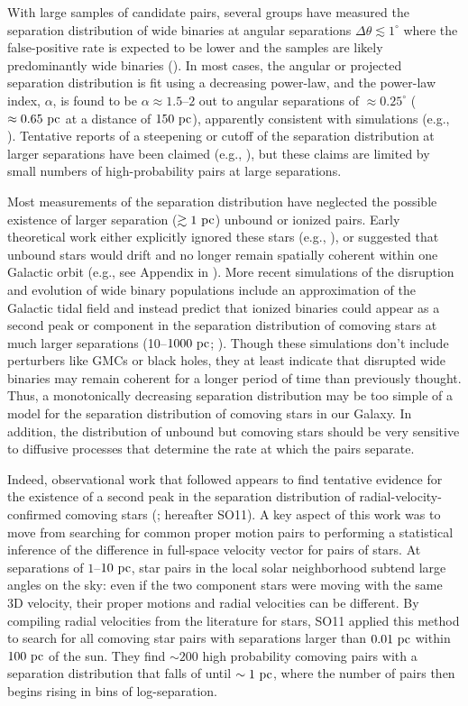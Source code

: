 \documentclass[modern, letterpaper]{aastex61}
\begin{document}
With large samples of candidate pairs, several groups have measured the
separation distribution of wide binaries at angular separations $\Delta \theta
\lesssim 1^\circ$ where the false-positive rate is expected to be lower
and the samples are likely predominantly wide binaries
(\citealt{Chaname:2004,Lepine:2007,Sesar:2008}).
In most cases, the angular or projected separation distribution is fit using a
decreasing power-law, and the power-law index, $\alpha$, is found to be $\alpha
\approx 1.5$--$2$ out to angular separations of $\approx 0.25^\circ$ ($\approx
0.65~\mathrm{pc}$ at a distance of $150~\mathrm{pc}$), apparently consistent with simulations
(e.g., \citealt{Weinberg:1987}).
Tentative reports of a steepening or cutoff of the separation distribution at
larger separations have been claimed (e.g., \citealt{Yoo:2004,Quinn:2009}), but
these claims are limited by small numbers of high-probability pairs at large
separations.

Most measurements of the separation distribution have neglected the possible
existence of larger separation ($\gtrsim 1~\mathrm{pc}$) unbound or ionized pairs.
Early theoretical work either explicitly ignored these stars (e.g.,
\citealt{Weinberg:1987}), or suggested that unbound stars would drift and no
longer remain spatially coherent within one Galactic orbit (e.g., see Appendix
in \citealt{Yoo:2004}).
More recent simulations of the disruption and evolution of wide binary
populations include an approximation of the Galactic tidal field and instead
predict that ionized binaries could appear as a second peak or component in the
separation distribution of comoving stars at much larger separations
(10--$1000~\mathrm{pc}$; \citealt{Jiang:2010}).
Though these simulations don't include perturbers like GMCs or black holes, they
at least indicate that disrupted wide binaries may remain coherent for a longer
period of time than previously thought.
Thus, a monotonically decreasing separation distribution may be too simple of a
model for the separation distribution of comoving stars in our Galaxy.
In addition, the distribution of unbound but comoving stars should be very
sensitive to diffusive processes that determine the rate at which the pairs
separate.

Indeed, observational work that followed appears to find tentative evidence for
the existence of a second peak in the separation distribution of
radial-velocity-confirmed comoving stars (\citealt{Shaya:2011}; hereafter SO11).
A key aspect of this work was to move from searching for common proper motion
pairs to performing a statistical inference of the difference in full-space
velocity vector for pairs of stars.
At separations of $1$--$10~\mathrm{pc}$, star pairs in the local solar neighborhood
subtend large angles on the sky: even if the two component stars were moving
with the same 3D velocity, their proper motions and radial velocities can be
different.
By compiling radial velocities from the literature for 
stars, SO11 applied this method to search for all comoving star pairs with
separations larger than $0.01~\mathrm{pc}$ within $100~\mathrm{pc}$ of the sun.
They find $\sim 200$ high probability comoving pairs with a separation
distribution that falls of until $\sim 1~\mathrm{pc}$, where the number of pairs then
begins rising in bins of log-separation.
\end{document}
